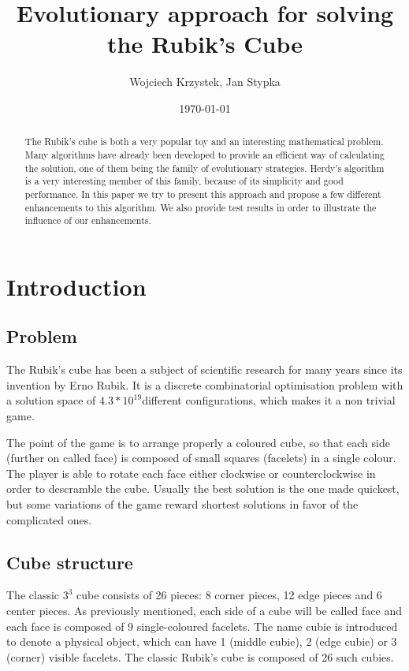 \documentclass[a4paper]{article}
\title{Evolutionary approach for solving the Rubik’s Cube}
\author{Wojciech Krzystek, Jan Stypka}
\date{\today}
\begin{document}
\maketitle

\begin{abstract}
The Rubik's cube is both a very popular toy and an interesting mathematical problem. Many algorithms have already been developed to provide an efficient way of calculating the solution, one of them being the family of evolutionary strategies. Herdy's algorithm is a very interesting member of this family, because of its simplicity and good performance. In this paper we try to present this approach and propose a few different enhancements to this algorithm. We also provide test results in order to illustrate the influence of our enhancements.
\end{abstract}

\section{Introduction}
\subsection{Problem}

The Rubik’s cube has been a subject of scientific research for many years since its invention by Erno Rubik. It is a discrete combinatorial optimisation problem with a solution space of \(4.3*10^{19}\)different configurations, which makes it a non trivial game.

The point of the game is to arrange properly a coloured cube, so that each side (further on called face) is composed of small squares (facelets) in a single colour. The player is able to rotate each face either clockwise or counterclockwise in order to descramble the cube.
Usually the best solution is the one made quickest, but some variations of the game reward shortest solutions in favor of the complicated ones.

\subsection{Cube structure}
The classic \(3^3\) cube consists of  26 pieces: 8 corner pieces, 12 edge pieces and 6 center pieces. As previously mentioned, each side of a cube will be called face and each face is composed of 9 single-coloured facelets. The name cubie is introduced to denote a physical object, which can have 1 (middle cubie), 2 (edge cubie) or 3 (corner) visible facelets. The classic Rubik’s cube is composed of 26 such cubies.
\end{document}
